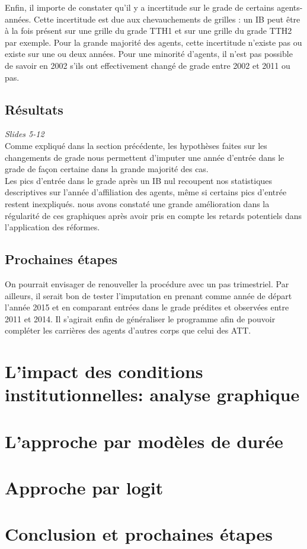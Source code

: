 \documentclass[11pt,a4paper]{article}
\begin{document}
Enfin, il importe de constater qu'il y a incertitude sur le grade de certains agents-années. Cette incertitude est due aux chevauchements de grilles : un IB peut être à la fois présent sur une grille du grade TTH1 et sur une grille du grade TTH2 par exemple. Pour la grande majorité des agents, cette incertitude n'existe pas ou existe sur une ou deux années. Pour une minorité d'agents, il n'est pas possible de savoir en 2002 s'ils ont effectivement changé de grade entre 2002 et 2011 ou pas.\\

\subsection{Résultats}

\textit{Slides 5-12}\\

Comme expliqué dans la section précédente, les hypothèses faites sur les changements de grade nous permettent d'imputer une année d'entrée dans le grade de façon certaine dans la grande majorité des cas.\\

Les pics d'entrée dans le grade après un IB nul recoupent nos statistiques descriptives sur l'année d'affiliation des agents, même si certains pics d'entrée restent inexpliqués. nous avons constaté une grande amélioration dans la régularité de ces graphiques après avoir pris en compte les retards potentiels dans l'application des réformes.

\subsection{Prochaines étapes}

On pourrait envisager de renouveller la procédure avec un pas trimestriel.
Par ailleurs, il serait bon de tester l'imputation en prenant comme année de départ l'année 2015 et en comparant entrées dans le grade prédites et observées entre 2011 et 2014.
Il s'agirait enfin de généraliser le programme afin de pouvoir compléter les carrières des agents d'autres corps que celui des ATT.

\section{L'impact des conditions institutionnelles: analyse graphique}

\section{L'approche par modèles de durée}

\section{Approche par logit}

\section{Conclusion et prochaines étapes}
\end{document}
